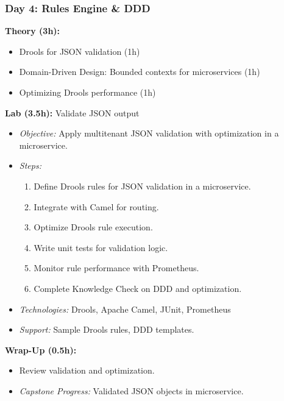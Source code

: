 \documentclass[11pt]{article}
\begin{document}
\subsubsection{Day 4: Rules Engine \& DDD}
\textbf{Theory (3h):}
\begin{itemize}
    \item Drools for JSON validation (1h)
    \item Domain-Driven Design: Bounded contexts for microservices (1h)
    \item Optimizing Drools performance (1h)
\end{itemize}
\textbf{Lab (3.5h):} Validate JSON output
\begin{itemize}
    \item \textit{Objective:} Apply multitenant JSON validation with optimization in a microservice.
    \item \textit{Steps:}
        \begin{enumerate}
            \item Define Drools rules for JSON validation in a microservice.
            \item Integrate with Camel for routing.
            \item Optimize Drools rule execution.
            \item Write unit tests for validation logic.
            \item Monitor rule performance with Prometheus.
            \item Complete Knowledge Check on DDD and optimization.
        \end{enumerate}
    \item \textit{Technologies:} Drools, Apache Camel, JUnit, Prometheus
    \item \textit{Support:} Sample Drools rules, DDD templates.
\end{itemize}
\textbf{Wrap-Up (0.5h):}
\begin{itemize}
    \item Review validation and optimization.
    \item \textit{Capstone Progress:} Validated JSON objects in microservice.
\end{itemize}
\end{document}
